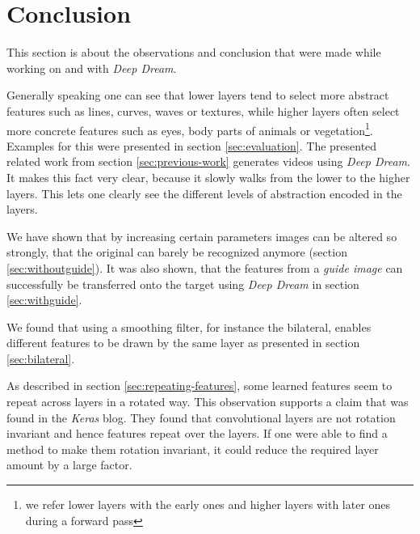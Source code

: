 \section{Conclusion}
\label{sec:conclusion}
This section is about the observations and conclusion that were made while working on and with \textit{Deep Dream}.

Generally speaking one can see that lower layers tend to select more abstract features such as lines, curves, waves or textures, while higher layers often select more concrete features such as eyes, body parts of animals or vegetation\footnote{we refer lower layers with the early ones and higher layers with later ones during a forward pass}.
Examples for this were presented in section \ref{sec:evaluation}.
The presented related work from section \ref{sec:previous-work} generates videos using \textit{Deep Dream}.
It makes this fact very clear, because it slowly walks from the lower to the higher layers.
This lets one clearly see the different levels of abstraction encoded in the layers.

We have shown that by increasing certain parameters images can be altered so strongly, that the original can barely be recognized anymore (section \ref{sec:withoutguide}).
It was also shown, that the features from a \emph{guide image} can successfully be transferred onto the target using \textit{Deep Dream} in section \ref{sec:withguide}.

We found that using a smoothing filter, for instance the bilateral, enables different features to be drawn by the same layer as presented in section \ref{sec:bilateral}.

As described in section \ref{sec:repeating-features}, some learned features seem to repeat across layers in a rotated way.
This observation supports a claim that was found in the \textit{Keras} blog.\cite{keras-blog}
They found that convolutional layers are not rotation invariant and hence features repeat over the layers.
If one were able to find a method to make them rotation invariant, it could reduce the required layer amount by a large factor.
